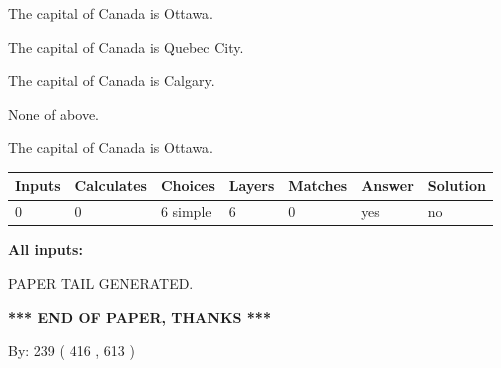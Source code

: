 \documentclass[12pt]{article}
\begin{document}
 
The capital of Canada is Ottawa.
 
 
The capital of Canada is Quebec City.
 
 
The capital of Canada is Calgary.
 
 
 None of above.
 
 
\noindent{}
 
 
The capital of Canada is Ottawa.
 
 
\noindent{}
 
 
   
   
   
   
\noindent\begin{tabular}{|l|l|l|l|l|l|l|}
 \hline
Inputs & Calculates & Choices & Layers & Matches & Answer & Solution \\ \hline
 0  & 
 0  & 
 6
  simple  
  & 
 6  & 
 0  & 
  yes & 
  no 
  \\ \hline
 \end{tabular}
   
   
   
   
\noindent{}
   
   
   
   
\noindent\vspace{0.1in}\hspace{-0.08in} {\textbf{\Large{All inputs: }}}
   
   
   
   
   
   
 \vspace{0.2in}
 
   
   
\vspace{2.0in} PAPER TAIL GENERATED.
   
   
   
   
\vspace{1.0in} 
{\textbf{\large{ *** END OF PAPER, THANKS *** }}} 
   
   
\hspace{1.0in} By: 
 239 ( 416 ,  613 )
   
   
   
   
\newpage 
\setcounter{page}{ 
   513001 } 
   
\end{document}
